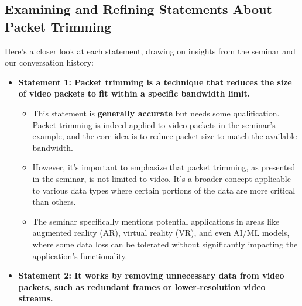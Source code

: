 \documentclass[
]{article}
\author{}
\date{}
\begin{document}
\subsection{Examining and Refining Statements About Packet
Trimming}\label{examining-and-refining-statements-about-packet-trimming}

Here's a closer look at each statement, drawing on insights from the
seminar and our conversation history:

\begin{itemize}
\item
  \textbf{Statement 1: Packet trimming is a technique that reduces the
  size of video packets to fit within a specific bandwidth limit.}

  \begin{itemize}
  
  \item
    This statement is \textbf{generally accurate} but needs some
    qualification. Packet trimming is indeed applied to video packets in
    the seminar's example, and the core idea is to reduce packet size to
    match the available bandwidth.
  \item
    However, it's important to emphasize that packet trimming, as
    presented in the seminar, is not limited to video. It's a broader
    concept applicable to various data types where certain portions of
    the data are more critical than others.
  \item
    The seminar specifically mentions potential applications in areas
    like augmented reality (AR), virtual reality (VR), and even AI/ML
    models, where some data loss can be tolerated without significantly
    impacting the application's functionality.
  \end{itemize}
\item
  \textbf{Statement 2: It works by removing unnecessary data from video
  packets, such as redundant frames or lower-resolution video streams.}

  \begin{itemize}
  

\end{itemize}
\end{itemize}
\end{document}
